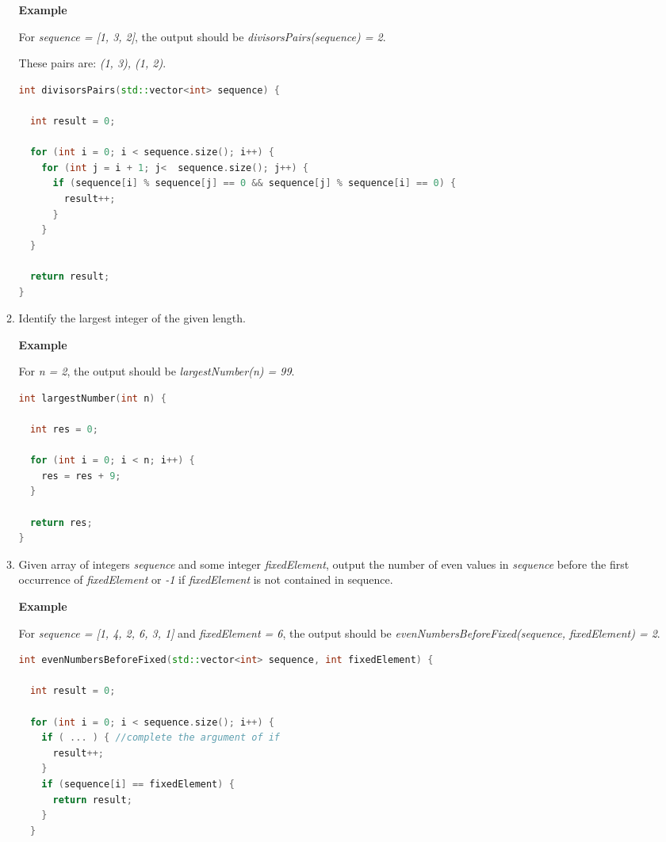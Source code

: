 \begin{enumerate}
\begin{enumerate}
\textbf{Example}

For \textit{sequence = [1, 3, 2]}, the output should be
\textit{divisorsPairs(sequence) = 2}.

These pairs are: \textit{(1, 3), (1, 2)}.
	
	\begin{lstlisting}[language=C++, frame=single]
int divisorsPairs(std::vector<int> sequence) {

  int result = 0;

  for (int i = 0; i < sequence.size(); i++) {
    for (int j = i + 1; j<  sequence.size(); j++) {
      if (sequence[i] % sequence[j] == 0 && sequence[j] % sequence[i] == 0) {
        result++;
      }
    }
  }

  return result;
}

	\end{lstlisting}


	\item Identify the largest integer of the given length.

\textbf{Example}

For \textit{n = 2}, the output should be
\textit{largestNumber(n) = 99}.
	
	\begin{lstlisting}[language=C++, frame=single]
int largestNumber(int n) {

  int res = 0;

  for (int i = 0; i < n; i++) {
    res = res + 9;
  }

  return res;
}
	\end{lstlisting}

	\item Given array of integers \textit{sequence} and some integer \textit{fixedElement}, output the number of even values in \textit{sequence} before the first occurrence of \textit{fixedElement} or \textit{-1} if \textit{fixedElement} is not contained in sequence.
	
\textbf{Example}

For \textit{sequence = [1, 4, 2, 6, 3, 1]} and \textit{fixedElement = 6}, the output should be
\textit{evenNumbersBeforeFixed(sequence, fixedElement) = 2}.
	
	\begin{lstlisting}[language=C++, frame=single]
int evenNumbersBeforeFixed(std::vector<int> sequence, int fixedElement) {

  int result = 0;

  for (int i = 0; i < sequence.size(); i++) {
    if ( ... ) { //complete the argument of if
      result++;
    }
    if (sequence[i] == fixedElement) {
      return result;
    }
  }


\end{lstlisting}
\end{enumerate}
\end{enumerate}
